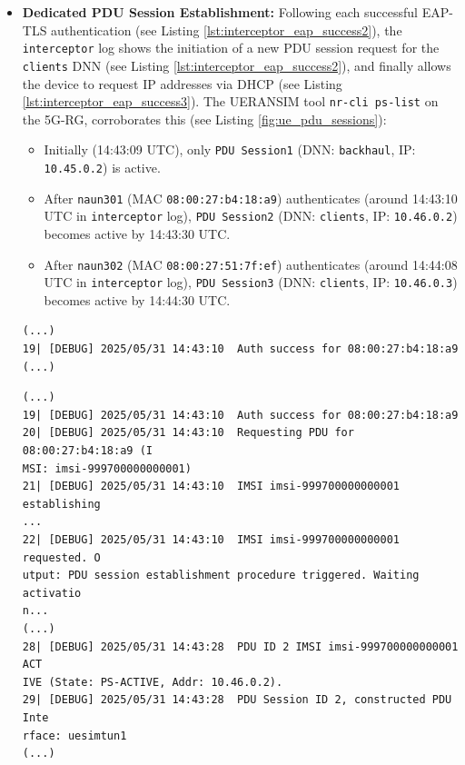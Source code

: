 \begin{itemize}
    \item{
        \textbf{Dedicated \ac{PDU} Session Establishment:} Following each successful \ac{EAP-TLS} authentication (see Listing \ref{lst:interceptor_eap_success2}), the \texttt{interceptor} log shows the initiation of a new \ac{PDU} session request for the \texttt{clients} \ac{DNN} (see Listing \ref{lst:interceptor_eap_success2}), and finally allows the device to request \ac{IP} addresses via \ac{DHCP}  (see Listing \ref{lst:interceptor_eap_success3}). The UERANSIM tool \texttt{nr-cli ps-list} on the \ac{5G-RG}, corroborates this (see Listing \ref{fig:ue_pdu_sessions}):
        \begin{itemize}
            \item Initially (14:43:09 \ac{UTC}), only \texttt{PDU Session1} (\ac{DNN}: \texttt{backhaul}, \ac{IP}: \texttt{10.45.0.2}) is active.
            
            \item After \texttt{naun301} (\ac{MAC} \texttt{08:00:27:b4:18:a9}) authenticates (around 14:43:10 \ac{UTC} in \texttt{interceptor} log), \texttt{PDU Session2} (\ac{DNN}: \texttt{clients}, \ac{IP}: \texttt{10.46.0.2}) becomes active by 14:43:30 \ac{UTC}.

            \item After \texttt{naun302} (\ac{MAC} \texttt{08:00:27:51:7f:ef}) authenticates (around 14:44:08 \ac{UTC} in \texttt{interceptor} log), \texttt{PDU Session3} (\ac{DNN}: \texttt{clients}, \ac{IP}: \texttt{10.46.0.3}) becomes active by 14:44:30 \ac{UTC}.
        \end{itemize}

\begin{lstlisting}[caption=\texttt{interceptor} captures authentication success,label={lst:interceptor_eap_success1}]
(...)
19| [DEBUG] 2025/05/31 14:43:10  Auth success for 08:00:27:b4:18:a9
(...)
\end{lstlisting}

\begin{lstlisting}[caption=\texttt{interceptor} requests \acs{PDU} session,label={lst:interceptor_eap_success2}]
(...)
19| [DEBUG] 2025/05/31 14:43:10  Auth success for 08:00:27:b4:18:a9
20| [DEBUG] 2025/05/31 14:43:10  Requesting PDU for 08:00:27:b4:18:a9 (I
MSI: imsi-999700000000001)
21| [DEBUG] 2025/05/31 14:43:10  IMSI imsi-999700000000001 establishing
...
22| [DEBUG] 2025/05/31 14:43:10  IMSI imsi-999700000000001 requested. O
utput: PDU session establishment procedure triggered. Waiting activatio
n...
(...)
28| [DEBUG] 2025/05/31 14:43:28  PDU ID 2 IMSI imsi-999700000000001 ACT
IVE (State: PS-ACTIVE, Addr: 10.46.0.2).
29| [DEBUG] 2025/05/31 14:43:28  PDU Session ID 2, constructed PDU Inte
rface: uesimtun1
(...)
\end{lstlisting}

}
\end{itemize}
